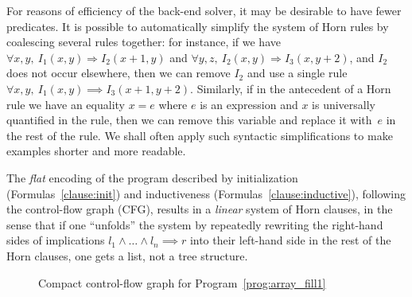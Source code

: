 \documentclass[a4paper]{article}
\theoremstyle{definition}
\theoremstyle{plain}
\begin{document}
For reasons of efficiency of the back-end solver, it may be desirable to have fewer predicates. It is possible to automatically simplify the system of Horn rules by coalescing several rules together: for instance, if we have $\forall x,y,~ I_1(x,y) \Rightarrow I_2(x+1,y)$ and $\forall y,z,~ I_2(x,y) \Rightarrow I_3(x,y+2)$, and $I_2$ does not occur elsewhere, then we can remove $I_2$ and use a single rule $\forall x,y,~ I_1(x,y) \implies I_3(x+1,y+2)$.
Similarly, if in the antecedent of a Horn rule we have an equality $x=e$ where $e$ is an expression and $x$ is universally quantified in the rule, then we can remove this variable and replace it with~$e$ in the rest of the rule.
We shall often apply such syntactic simplifications to make examples shorter and more readable.

The \emph{flat} encoding of the program described by initialization (Formulas~\ref{clause:init}) and inductiveness (Formulas~\ref{clause:inductive}), following the control-flow graph (CFG), results in a \emph{linear} system of Horn clauses, in the sense that if one ``unfolds'' the system by repeatedly rewriting the right-hand sides of implications $l_1 \land \dots \land l_n \implies r$ into their left-hand side in the rest of the Horn clauses, one gets a list, not a tree structure.

\begin{figure}
\begin{center}
\end{center}
\caption{Compact control-flow graph for Program~\ref{prog:array_fill1}}
\label{fig:array_fill1_cfg}
\end{figure}
\end{document}
